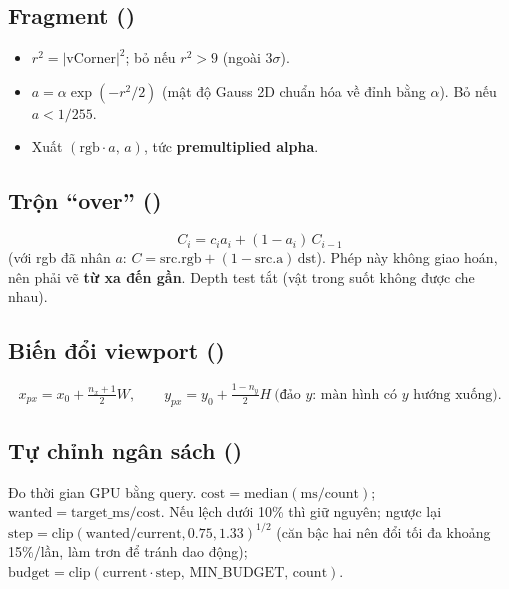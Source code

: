 \subsection{Fragment ()}
\begin{itemize}
\item $r^2=|\mathrm{vCorner}|^2$; bỏ nếu $r^2>9$ (ngoài $3\sigma$).
\item $a=\alpha\exp(-r^2/2)$ (mật độ Gauss 2D chuẩn hóa về đỉnh bằng $\alpha$). Bỏ nếu $a<1/255$.
\item Xuất $(\mathrm{rgb}\cdot a,\,a)$, tức \textbf{premultiplied alpha}.
\end{itemize}

\subsection{Trộn ``over'' ()}
\[
C_i = c_i a_i + (1-a_i)\,C_{i-1}
\]
(với rgb đã nhân $a$: $C=\mathrm{src.rgb}+(1-\mathrm{src.a})\,\mathrm{dst}$). Phép này không giao hoán, nên phải vẽ \textbf{từ xa đến gần}. Depth test tắt (vật trong suốt không được che nhau).

\subsection{Biến đổi viewport ()}\label{s:viewport}
\[
x_{px}=x_0+\tfrac{n_x+1}{2}W,\qquad y_{px}=y_0+\tfrac{1-n_y}{2}H\ \text{(đảo $y$: màn hình có $y$ hướng xuống)}.
\]

\subsection{Tự chỉnh ngân sách ()}
Đo thời gian GPU bằng query. $\mathrm{cost}=\mathrm{median}(\mathrm{ms}/\mathrm{count})$; $\mathrm{wanted}=\mathrm{target\_ms}/\mathrm{cost}$. Nếu lệch dưới 10\% thì giữ nguyên; ngược lại $\mathrm{step}=\mathrm{clip}(\mathrm{wanted}/\mathrm{current},0.75,1.33)^{1/2}$ (căn bậc hai nên đổi tối đa khoảng 15\%/lần, làm trơn để tránh dao động); $\mathrm{budget}=\mathrm{clip}(\mathrm{current}\cdot\mathrm{step},\,\mathrm{MIN\_BUDGET},\,\mathrm{count})$.

